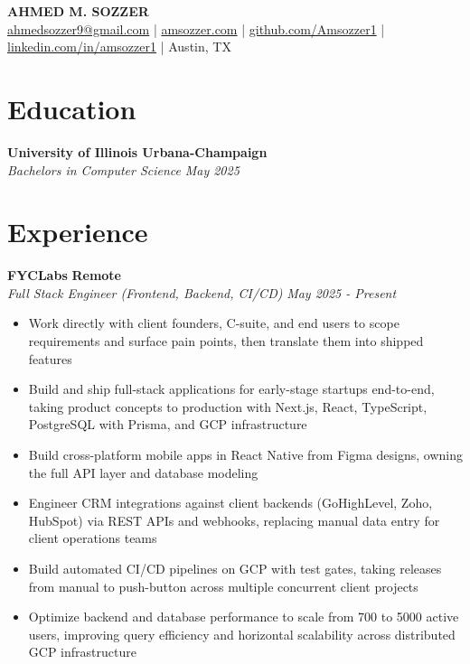 \documentclass[10pt,letterpaper]{article}
\begin{document}
\begin{center}
  \textbf{\Large AHMED M. SOZZER}\\
  \smallskip
   \href{mailto:ahmedsozzer9@gmail.com}{ahmedsozzer9@gmail.com} | \href{http://amsozzer.com}{amsozzer.com} | \href{http://github.com/Amsozzer1}{github.com/Amsozzer1} | \href{http://linkedin.com/in/amsozzer1}{linkedin.com/in/amsozzer1} | Austin, TX
\end{center}

\section*{Education}
\noindent\textbf{University of Illinois Urbana-Champaign}\\
\textit{Bachelors in Computer Science} \hfill \textit{May 2025}

\section*{Experience}
\noindent\textbf{FYCLabs} \hfill \textbf{Remote}\\
\textit{Full Stack Engineer (Frontend, Backend, CI/CD)} \hfill \textit{May 2025 - Present}
\begin{itemize}
  \item Work directly with client founders, C-suite, and end users to scope requirements and surface pain points, then translate them into shipped features
  \item Build and ship full-stack applications for early-stage startups end-to-end, taking product concepts to production with Next.js, React, TypeScript, PostgreSQL with Prisma, and GCP infrastructure
  \item Build cross-platform mobile apps in React Native from Figma designs, owning the full API layer and database modeling
  \item Engineer CRM integrations against client backends (GoHighLevel, Zoho, HubSpot) via REST APIs and webhooks, replacing manual data entry for client operations teams
  \item Build automated CI/CD pipelines on GCP with test gates, taking releases from manual to push-button across multiple concurrent client projects
  \item Optimize backend and database performance to scale from 700 to 5000 active users, improving query efficiency and horizontal scalability across distributed GCP infrastructure
\end{itemize}
\end{document}
